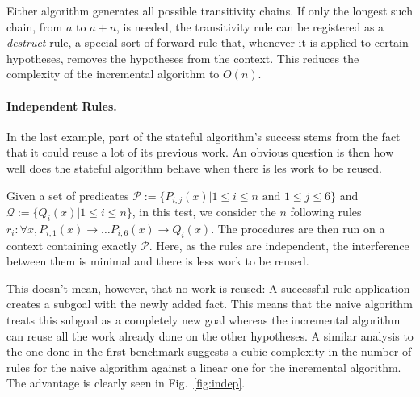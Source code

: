 \documentclass[runningheads]{llncs}
\begin{document}
Either algorithm generates all possible transitivity chains.
If only the longest such chain, from $a$ to $a + n$, is needed, the transitivity rule can be registered as a \emph{destruct} rule, a special sort of forward rule that, whenever it is applied to certain hypotheses, removes the hypotheses from the context.
This reduces the complexity of the incremental algorithm to $O(n)$.

\paragraph{Independent Rules.}
In the last example, part of the stateful algorithm's success stems from the fact that it could reuse a lot of its previous work.
An obvious question is then how well does the stateful algorithm behave when there is les work to be reused.

Given a set of predicates $\mathcal{P} := \{P_{i,j} (x) | 1 \leq i \leq n \text{ and } 1 \leq j \leq 6\}$ and $\mathcal{Q} :=\{Q_{i}(x) | 1 \leq i \leq n \}$, in this test, we consider the $n$ following rules $r_i : \forall x, P_{i,1}(x)\to \dots P_{i,6}(x) \to Q_i(x)$.
The procedures are then run on a context containing exactly $\mathcal{P}$.
Here, as the rules are independent, the interference between them is minimal and there is less work to be reused.

This doesn't mean, however, that no work is reused: A successful rule application creates a subgoal with the newly added fact.
This means that the naive algorithm treats this subgoal as a completely new goal whereas the incremental algorithm can reuse all the work already done on the other hypotheses.
A similar analysis to the one done in the first benchmark suggests a cubic complexity in the number of rules for the naive algorithm against a linear one for the incremental algorithm.
The advantage is clearly seen in Fig.~\ref{fig:indep}.

\end{document}
